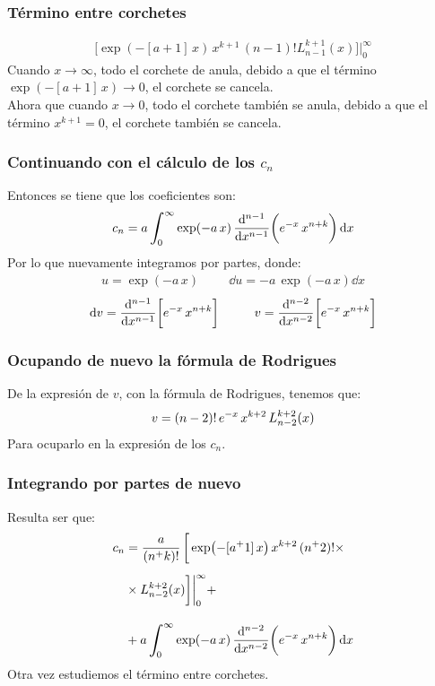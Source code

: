 \documentclass[12pt]{beamer}
\begin{document}
\begin{frame}
\frametitle{Término entre corchetes}
\begin{align*}
\bigg[ \exp(-[a + 1] \, x) \, x^{k+1} \, (n - 1)! L_{n-1}^{k+1}(x) \bigg] \bigg\vert_{0}^{\infty}
\end{align*}
\pause
Cuando $x \to \infty$, todo el corchete de anula, debido a que el término $\exp(-[a + 1] \, x) \to 0$, \pause el corchete se cancela.
\\
\bigskip
\pause
Ahora que cuando $x \to 0$, todo el corchete también se anula, debido a que el término $x^{k+1} = 0$, el corchete también se cancela.
\end{frame}
\begin{frame}
\frametitle{Continuando con el cálculo de los $c_{n}$}
Entonces se tiene que los coeficientes son:
\pause
\begin{align*}
c_{n} = a \, \scaleint{6ex}_{\bs 0}^{\infty} \exp( - a \, x) \, \dv[n-1]{x} \bigg( e^{-x} \, x^{n+k} \bigg) \dd{x}
\end{align*}
\pause
Por lo que nuevamente integramos por partes,
donde:
\pause
\begin{align*}
u = \exp(-a \, x) \hspace{1cm} \dd{u} = - a \, \exp(-a \, x) \dd{x} 
\end{align*}
\pause
\begin{align*}
\dd{v} = \dv[n-1]{x} \bigg[ e^{-x} \, x^{n+k} \bigg] \hspace{1cm} v = \dv[n-2]{x} \bigg[ e^{-x} \, x^{n+k} \bigg]
\end{align*}
\end{frame}
\begin{frame}
\frametitle{Ocupando de nuevo la fórmula de Rodrigues}
De la expresión de $v$, con la fórmula de Rodrigues, tenemos que:
\pause
\begin{align*}
v = (n - 2)! \, e^{-x} \, x^{k+2} \, \scaleto{L_{n-2}^{k+2}(x)}{3ex}
\end{align*}
\pause
Para ocuparlo en la expresión de los $c_{n}$.
\end{frame}
\begin{frame}
\frametitle{Integrando por partes de nuevo}
Resulta ser que:
\pause
\begin{align*}
c_{n} &= \dfrac{a}{(n ^{+} k)!} \, \bigg[ \exp(-[a ^{+} 1] \, x) \, x^{k+2} \, (n ^{+} 2)! \times \\[0.5em]
&\times  L_{n-2}^{k+2}(x) \bigg] \bigg\vert_{0}^{\infty} + \\[1em]
&+ a \, \scaleint{6ex}_{\bs 0}^{\infty} \exp( - a \, x) \, \dv[n-2]{x} \bigg( e^{-x} \, x^{n+k} \bigg) \dd{x}
\end{align*}
\pause
Otra vez estudiemos el término entre corchetes.
\end{frame}
\end{document}
